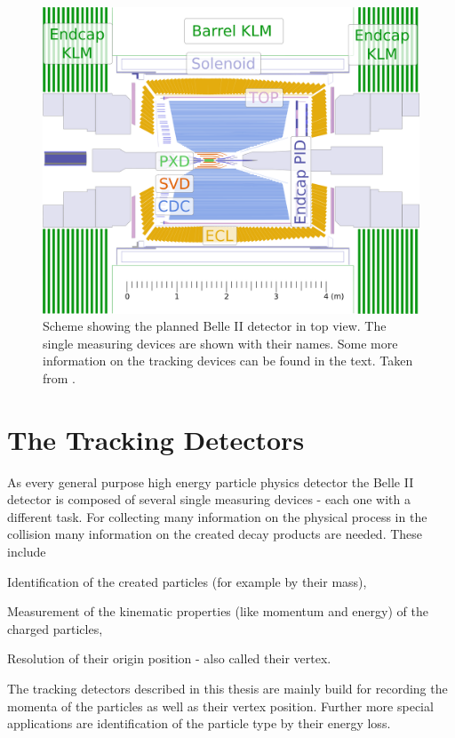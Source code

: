 \begin{figure}
 \centering
 \includegraphics[height=0.4\textheight]{figures/experimental_setup/detector_crossection_labels.pdf}
 \caption{Scheme showing the planned Belle II detector in top view. The single measuring devices are shown with their names. Some more information on the tracking devices can be found in the text. Taken from \cite{christian}.}
 \label{fig-belle2}
\end{figure}

\section{The Tracking Detectors}

As every general purpose high energy particle physics detector the Belle II detector is composed of several single measuring devices - each one with a different task. For collecting many information on the physical process in the collision many information on the created decay products are needed. These include
\begin{zlist}
 \item Identification of the created particles (for example by their mass),
 \item Measurement of the kinematic properties (like momentum and energy) of the charged particles,
 \item Resolution of their origin position - also called their vertex.
\end{zlist}

The tracking detectors described in this thesis are mainly build for recording the momenta of the particles as well as their vertex position. Further more special applications are identification of the particle type by their energy loss.

